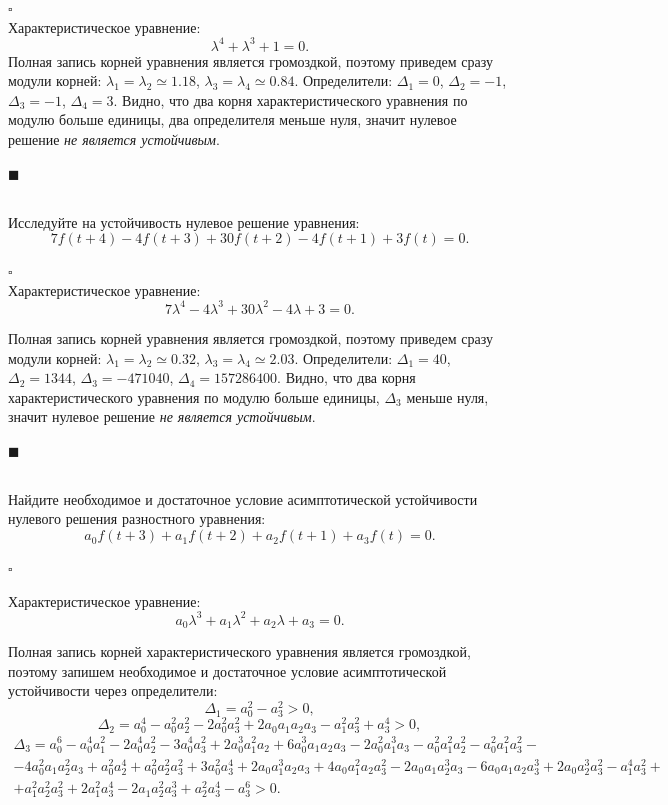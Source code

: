 \documentclass[a4paper]{article}
\newcommand{\solutionstart}{{\noindent $\square$ \\}}
\newcommand{\solutionend}{{\noindent $\blacksquare$ \\}}
\begin{document}
\solutionstart
Характеристическое уравнение: 
\[
\lambda^4 + \lambda^3 + 1 = 0.
\]
Полная запись корней уравнения является громоздкой, поэтому приведем сразу модули корней: $\lambda_1 = \lambda_2 \simeq 1.18$, $\lambda_3 = \lambda_4 \simeq 0.84$. Определители: $\Delta_1 = 0$, $\Delta_2 = -1$, $\Delta_3 = -1$, $\Delta_4 = 3$. Видно, что два корня характеристического уравнения по модулю больше единицы, два определителя меньше нуля, значит нулевое решение \textit{не является устойчивым}.

\solutionend


\subsection{}
Исследуйте на устойчивость нулевое решение уравнения:
\[
	7 f(t + 4) - 4 f (t + 3) + 30 f(t + 2) - 4 f(t + 1) + 3 f(t) = 0.
\]

\solutionstart
Характеристическое уравнение: 
\[
7 \lambda^4 - 4 \lambda^3 + 30 \lambda^2 - 4 \lambda + 3 = 0.
\]

Полная запись корней уравнения является громоздкой, поэтому приведем сразу модули корней: $\lambda_1 = \lambda_2 \simeq 0.32$, $\lambda_3 = \lambda_4 \simeq 2.03$. Определители: $\Delta_1 = 40$, $\Delta_2 = 1344$, $\Delta_3 = -471040$, $\Delta_4 = 157286400$. Видно, что два корня характеристического уравнения по модулю больше единицы, $\Delta_3$ меньше нуля, значит нулевое решение \textit{не является устойчивым}.

\solutionend


\subsection{}
Найдите необходимое и достаточное условие асимптотической устойчивости нулевого решения разностного уравнения:
\[
	a_0 f (t + 3) + a_1 f(t + 2) + a_2 f(t + 1) + a_3 f(t) = 0.
\]

\solutionstart

Характеристическое уравнение:
\[
	a_0 \lambda^3 + a_1 \lambda^2 + a_2 \lambda + a_3 = 0.
\]

Полная запись корней характеристического уравнения является громоздкой, поэтому запишем необходимое и достаточное условие асимптотической устойчивости через определители:
\[
\Delta_1 = a_0^2 - a_3^2 > 0,
\]
\[
\Delta_2 = a_0^4 - a_0^2 a_2^2 - 2 a_0^2 a_3^2 + 2 a_0 a_1 a_2 a_3 - a_1^2 a_3^2 + a_3^4 > 0,
\]
\begin{gather*}
\Delta_3 = a_0^6 - a_0^4 a_1^2 - 2 a_0^4 a_2^2 - 3 a_0^4 a_3^2 + 2 a_0^3 a_1^2 a_2 + 6 a_0^3 a_1 a_2 a_3 - 2 a_0^2 a_1^3 a_3 - a_0^2 a_1^2 a_2^2 - a_0^2 a_1^2 a_3^2 -\\- 4 a_0^2 a_1 a_2^2 a_3 + a_0^2 a_2^4 + a_0^2 a_2^2 a_3^2 + 3 a_0^2 a_3^4 + 2 a_0 a_1^3 a_2 a_3 + 4 a_0 a_1^2 a_2 a_3^2 - 2 a_0 a_1 a_2^3 a_3 - 6 a_0 a_1 a_2 a_3^3 + 2 a_0 a_2^3 a_3^2 - a_1^4 a_3^2 +\\+ a_1^2 a_2^2 a_3^2 + 2 a_1^2 a_3^4 - 2 a_1 a_2^2 a_3^3 + a_2^2 a_3^4 - a_3^6 > 0.
\end{gather*}
\end{document}
